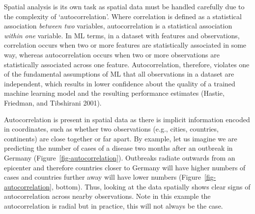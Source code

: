 Spatial analysis is its own task as spatial data must be handled
carefully due to the complexity of `autocorrelation'. Where
correlation is defined as a statistical association
\emph{between two} variables,
autocorrelation
is a statistical association \emph{within one} variable. In ML terms, in
a dataset with features and observations, correlation occurs when two or
more features are statistically associated in some way, whereas
autocorrelation occurs when two or more observations are statistically
associated across one feature. Autocorrelation, therefore, violates one
of the fundamental assumptions of ML that all observations in a dataset
are independent, which results in lower confidence about the quality of
a trained machine learning model and the resulting performance estimates
(Hastie, Friedman, and Tibshirani 2001).

Autocorrelation is present in spatial data as there is implicit
information encoded in coordinates, such as whether two observations
(e.g., cities, countries, continents) are close together or far apart.
By example, let us imagine we are predicting the number of cases of a
disease two months after an outbreak in Germany
(Figure~\ref{fig-autocorrelation}). Outbreaks radiate outwards from an
epicenter and therefore countries closer to Germany will have higher
numbers of cases and countries further away will have lower numbers
(Figure~\ref{fig-autocorrelation}, bottom). Thus, looking at the data
spatially shows clear signs of autocorrelation across nearby
observations. Note in this example the autocorrelation is radial but in
practice, this will not always be the case.

